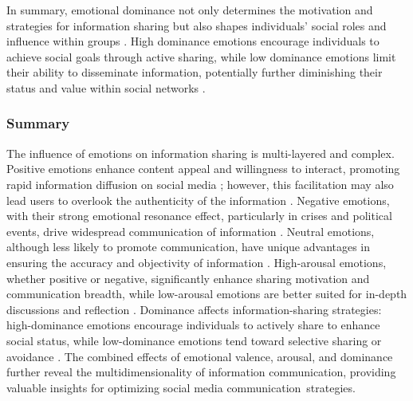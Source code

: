 
In summary, emotional dominance not only determines the motivation and strategies for information sharing but also shapes individuals’ social roles and influence within groups \cite{mehrabian1996pleasure, bandura1989human}. High dominance emotions encourage individuals to achieve social goals through active sharing, while low dominance emotions limit their ability to disseminate information, potentially further diminishing their status and value within social networks \cite{fredrickson2001role, morrison2000organizational}.


\subsubsection{Summary}
The influence of emotions on information sharing is multi-layered and complex. Positive emotions enhance content appeal and willingness to interact, promoting rapid information diffusion on social media \cite{ferrara2015measuring}; however, this facilitation may also lead users to overlook the authenticity of the information \cite{dabbous2023influence}. Negative emotions, with their strong emotional resonance effect, particularly in crises and political events, drive widespread communication of information \cite{lopez2021translating}. Neutral emotions, although less likely to promote communication, have unique advantages in ensuring the accuracy and objectivity of information \cite{son2022emotion}.
High-arousal emotions, whether positive or negative, significantly enhance sharing motivation and communication breadth, while low-arousal emotions are better suited for in-depth discussions and reflection \cite{berger2012makes}. Dominance affects information-sharing strategies: high-dominance emotions encourage individuals to actively share to enhance social status, while low-dominance emotions tend toward selective sharing or avoidance \cite{mehrabian1996pleasure, bandura1989human}. The combined effects of emotional valence, arousal, and dominance further reveal the multidimensionality of information communication, providing valuable insights for optimizing social media communication~strategies.


